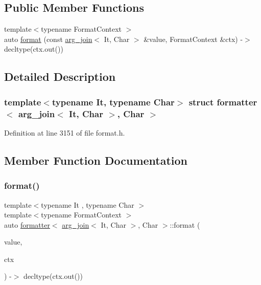 \subsection*{Public Member Functions}
\begin{DoxyCompactItemize}
\item 
{\footnotesize template$<$typename Format\+Context $>$ }\\auto \hyperlink{structformatter_3_01arg__join_3_01_it_00_01_char_01_4_00_01_char_01_4_ae0c4a217ef67f0a573d1c4fd9bfe0472}{format} (const \hyperlink{structarg__join}{arg\+\_\+join}$<$ It, Char $>$ \&value, Format\+Context \&ctx) -\/$>$ decltype(ctx.\+out())
\end{DoxyCompactItemize}


\subsection{Detailed Description}
\subsubsection*{template$<$typename It, typename Char$>$\newline
struct formatter$<$ arg\+\_\+join$<$ It, Char $>$, Char $>$}



Definition at line 3151 of file format.\+h.



\subsection{Member Function Documentation}
\mbox{\label{structformatter_3_01arg__join_3_01_it_00_01_char_01_4_00_01_char_01_4_ae0c4a217ef67f0a573d1c4fd9bfe0472}} 
\subsubsection{\texorpdfstring{format()}{format()}}
{\footnotesize\ttfamily template$<$typename It , typename Char $>$ \\
template$<$typename Format\+Context $>$ \\
auto \hyperlink{structformatter}{formatter}$<$ \hyperlink{structarg__join}{arg\+\_\+join}$<$ It, Char $>$, Char $>$\+::format (\begin{DoxyParamCaption}\item[{const \hyperlink{structarg__join}{arg\+\_\+join}$<$ It, Char $>$ \&}]{value,  }\item[{Format\+Context \&}]{ctx }\end{DoxyParamCaption}) -\/$>$ decltype(ctx.\+out()) \hspace{0.3cm}{\ttfamily [inline]}}



